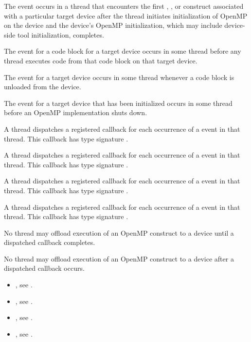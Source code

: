 \events

The  event occurs in a thread that encounters
the first , , or  construct associated with a particular target device
after the thread initiates initialization of OpenMP on the device and the
device's OpenMP initialization, which may include device-side tool
initialization, completes.

The  event for a code block for a target device occurs in some thread
before any thread executes code from that code block on that target device.

The  event for a target device occurs in some thread
whenever a code block is unloaded from the device.

The  event for a target device that has been initialized
occurs in some thread before an OpenMP implementation shuts down.

\tools

A thread dispatches a registered 
callback for each occurrence of a  event in
that thread.  This callback has type signature
.

A thread dispatches a registered 
callback for each occurrence of a  event in
that thread.  This callback has type signature
.

A thread dispatches a registered 
callback for each occurrence of a  event in
that thread.  This callback has type signature
.

A thread dispatches a registered 
callback for each occurrence of a  event in
that thread.  This callback has type signature
.

\restrictions
No thread may offload execution of an OpenMP construct to a device until a
dispatched  callback completes.

No thread may offload execution of an OpenMP construct to a device after a
dispatched  callback occurs.

\crossreferences
\begin{itemize}
\item {}, see
.
\item {}, see
.
\item {}, see
.
\item {}, see
.
\end{itemize}


